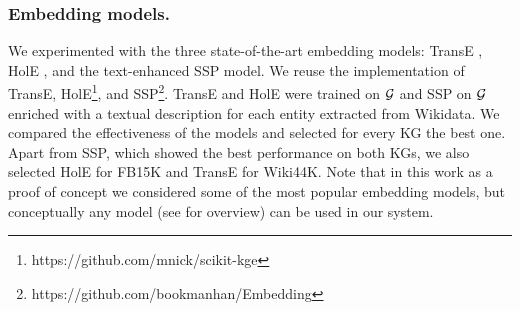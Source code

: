 \subsubsection{Embedding models.}
We experimented with the three state-of-the-art embedding models:
TransE \cite{Bordes:NIPS2013}, HolE \cite{DBLP:conf/aaai/NickelRP16}, and the text-enhanced SSP \cite{DBLP:conf/aaai/0005HMZ17} model. We reuse the implementation of TransE, HolE\footnote{https://github.com/mnick/scikit-kge}, and SSP\footnote{https://github.com/bookmanhan/Embedding}.
TransE and HolE were trained on $\mathcal{G}$ and SSP on $\mathcal{G}$ enriched with 
a textual description for each entity extracted from Wikidata. We compared the
effectiveness of the models and selected for every KG the best one. Apart from SSP, which showed the best performance on both KGs, we also selected HolE for FB15K and TransE for Wiki44K. Note that in this work as a proof of concept we considered some of the most popular embedding models, but conceptually any model (see \cite{DBLP:journals/tkde/WangMWG17} for overview) can be used in our system.


